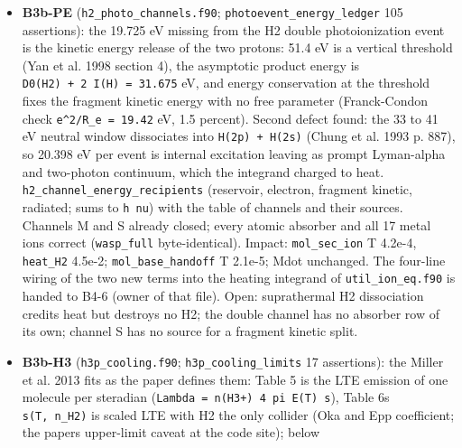 \documentclass[english,a4paper]{my_memo}
\begin{document}
\begin{itemize}
  solver failure and falls back to marching, which ends on a du plateau
  with a state that certifies worse than the JFNK state; assigned to B3a
  (\texttt{info\ =\ 2} = a failed stationarity claim, written uncertified, exit 2, no
  fallback) and to B5a (\texttt{steady\_newton.f90}: the residual evaluated on the
  self-consistent composition of the current iterate, so gate, merit and
  returned state measure one thing). Also found: the JFNK stop message
  prints an unset \texttt{resid\_th} (B3a); \texttt{certification\_row\_measure} and
  \texttt{relnorm\_over\_cells} are one expression written twice.
\item
  \textbf{B3b-PE} (\texttt{h2\_photo\_channels.f90}; \texttt{photoevent\_energy\_ledger} 105
  assertions): the 19.725 eV missing from the H2 double photoionization
  event is the kinetic energy release of the two protons: 51.4 eV is a
  vertical threshold (Yan et al. 1998 section 4), the asymptotic product
  energy is \texttt{D0(H2)\ +\ 2\ I(H)\ =\ 31.675} eV, and energy conservation at the
  threshold fixes the fragment kinetic energy with no free parameter
  (Franck-Condon check \texttt{e\^{}2/R\_e\ =\ 19.42} eV, 1.5 percent). Second defect
  found: the 33 to 41 eV neutral window dissociates into \texttt{H(2p)\ +\ H(2s)}
  (Chung et al. 1993 p. 887), so 20.398 eV per event is internal excitation
  leaving as prompt Lyman-alpha and two-photon continuum, which the
  integrand charged to heat. \texttt{h2\_channel\_energy\_recipients} (reservoir,
  electron, fragment kinetic, radiated; sums to \texttt{h\ nu}) with the table of
  channels and their sources. Channels M and S already closed; every atomic absorber
  and all 17 metal ions correct (\texttt{wasp\_full} byte-identical). Impact:
  \texttt{mol\_sec\_ion} T 4.2e-4, \texttt{heat\_H2} 4.5e-2; \texttt{mol\_base\_handoff} T 2.1e-5;
  Mdot unchanged. The four-line wiring of the two new terms into the
  heating integrand of \texttt{util\_ion\_eq.f90} is handed to B4-6 (owner of that
  file). Open: suprathermal H2 dissociation credits heat but destroys no
  H2; the double channel has no absorber row of its own; channel S has no
  source for a fragment kinetic split.
\item
  \textbf{B3b-H3} (\texttt{h3p\_cooling.f90}; \texttt{h3p\_cooling\_limits} 17 assertions): the
  Miller et al. 2013 fits as the paper defines them: Table 5 is the LTE
  emission of one molecule per steradian (\texttt{Lambda\ =\ n(H3+)\ 4\ pi\ E(T)\ s}),
  Table 6\textquotesingle s \texttt{s(T,\ n\_H2)} is scaled LTE with H2 the only collider (Oka and
  Epp coefficient; the paper\textquotesingle s upper-limit caveat at the code site); below

\end{itemize}
\end{document}

